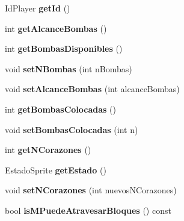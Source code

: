 \begin{DoxyCompactItemize}
\item 
Id\+Player {\bfseries get\+Id} ()\hypertarget{class_player_a0fa3c8a7f45074e4734ed67a11c3eb2a}{}\label{class_player_a0fa3c8a7f45074e4734ed67a11c3eb2a}

\item 
int {\bfseries get\+Alcance\+Bombas} ()\hypertarget{class_player_a5a8eed2db4c0702ff184c2e591b86eba}{}\label{class_player_a5a8eed2db4c0702ff184c2e591b86eba}

\item 
int {\bfseries get\+Bombas\+Disponibles} ()\hypertarget{class_player_a9346eacf7896339462843d04e69201a3}{}\label{class_player_a9346eacf7896339462843d04e69201a3}

\item 
void {\bfseries set\+N\+Bombas} (int n\+Bombas)\hypertarget{class_player_aefb09c11910bdd64a1030f3f2576d4b2}{}\label{class_player_aefb09c11910bdd64a1030f3f2576d4b2}

\item 
void {\bfseries set\+Alcance\+Bombas} (int alcance\+Bombas)\hypertarget{class_player_ae24d729abd2b7ccc9f358ac72498fcde}{}\label{class_player_ae24d729abd2b7ccc9f358ac72498fcde}

\item 
int {\bfseries get\+Bombas\+Colocadas} ()\hypertarget{class_player_a311bbbb89e728b69a7ba82b283f9b180}{}\label{class_player_a311bbbb89e728b69a7ba82b283f9b180}

\item 
void {\bfseries set\+Bombas\+Colocadas} (int n)\hypertarget{class_player_a4b76cf4f128409d53516d083d4b7584f}{}\label{class_player_a4b76cf4f128409d53516d083d4b7584f}

\item 
int {\bfseries get\+N\+Corazones} ()\hypertarget{class_player_a3dfb69349c809eb38546a804a40e741b}{}\label{class_player_a3dfb69349c809eb38546a804a40e741b}

\item 
Estado\+Sprite {\bfseries get\+Estado} ()\hypertarget{class_player_a1b5475ae5256e13e31c2579ea42dde99}{}\label{class_player_a1b5475ae5256e13e31c2579ea42dde99}

\item 
void {\bfseries set\+N\+Corazones} (int nuevos\+N\+Corazones)\hypertarget{class_player_a39b88679bf5da3090ba70e5d1bb1a8e2}{}\label{class_player_a39b88679bf5da3090ba70e5d1bb1a8e2}

\item 
bool {\bfseries is\+M\+Puede\+Atravesar\+Bloques} () const \hypertarget{class_player_af784628d68cf00d569964b9839031f5b}{}\label{class_player_af784628d68cf00d569964b9839031f5b}


\end{DoxyCompactItemize}

